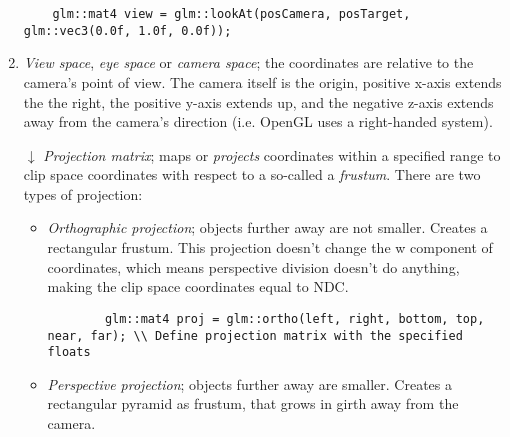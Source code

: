 \documentclass[8pt, table, xcdraw]{article}%
\begin{document}
\begin{enumerate}
    \begin{lstlisting}
    glm::mat4 view = glm::lookAt(posCamera, posTarget, glm::vec3(0.0f, 1.0f, 0.0f));
    \end{lstlisting}
    
    \item \emph{View space}, \emph{eye space} or \emph{camera space}; the coordinates are relative to the camera's point of view. The camera itself is the origin, positive x-axis extends the the right, the positive y-axis extends up, and the negative z-axis extends away from the camera's direction (i.e. OpenGL uses a right-handed system).
    \item[\large$\downarrow$] \emph{Projection matrix}; maps or \emph{projects} coordinates within a specified range to clip space coordinates with respect to a so-called a \emph{frustum}. There are two types of projection:
    \begin{itemize}
        \item \emph{Orthographic projection}; objects further away are not smaller. Creates a rectangular frustum. This projection doesn't change the w component of coordinates, which means perspective division doesn't do anything, making the clip space coordinates equal to NDC.
        
        \begin{lstlisting}
        glm::mat4 proj = glm::ortho(left, right, bottom, top, near, far); \\ Define projection matrix with the specified floats
        \end{lstlisting}
        
        \item \emph{Perspective projection}; objects further away are smaller. Creates a rectangular pyramid as frustum, that grows in girth away from the camera.
        

\end{itemize}
\end{enumerate}
\end{document}
